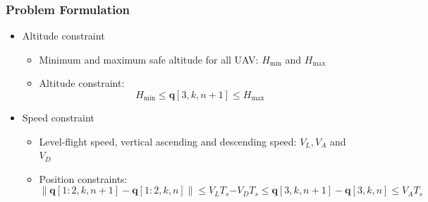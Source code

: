 \documentclass[11.5pt]{beamer}
\begin{document}
\begin{frame}
	\frametitle{Problem Formulation}
	\begin{itemize}\itemsep2em
		\item<1-> Altitude constraint
		\begin{itemize}
			\item Minimum and maximum safe altitude for all UAV: $H_{\min}$ and $H_{\max}$
			\item Altitude constraint: 
				\begin{equation}\label{Eq1}
					H_{\min}\leq\boldsymbol{q}[3,k,n+1]\leq H_{\max}
				\end{equation}
		\end{itemize}
		\item<2-> Speed constraint
		\begin{itemize}
			\item Level-flight speed, vertical ascending and descending speed: $V_L,V_A$ and $V_D$
			\item Position constraints:
				\begin{subequations}
					\begin{equation}\label{Eq2.1}
						\left\lVert\boldsymbol{q}[1:2,k,n+1]-\boldsymbol{q}[1:2,k,n]\right\rVert\leq V_LT_s
					\end{equation}
					\begin{equation}\label{Eq2.2}
						-V_DT_s\leq\boldsymbol{q}[3,k,n+1]-\boldsymbol{q}[3,k,n]\leq V_AT_s
					\end{equation}
				\end{subequations}
		\end{itemize}
	\end{itemize}
\end{frame}
\end{document}
